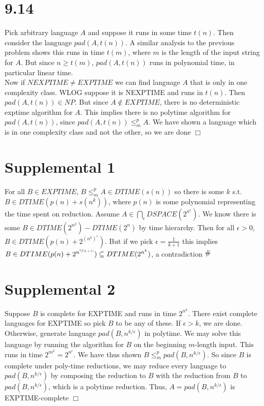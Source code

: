 \documentclass{article}
\newcommand{\contra}{\raisebox{\depth}{\#}}
\begin{document}
\section*{9.14}
Pick arbitrary language $A$ and suppose it runs in some time $t(n)$. Then consider the language $pad(A,t(n))$. A similar analysis to the previous problem shows this runs in time $t(m)$, where $m$ is the length of the input string for $A$. But since $n \geqslant t(m)$, $pad(A,t(n))$ runs in polynomial time, in particular linear time.\\
Now if $NEXPTIME \neq EXPTIME$ we can find language $A$ that is only in one complexity class. WLOG suppose it is NEXPTIME and runs in $t(n)$. Then $pad(A,t(n)) \in NP$. But since $A \notin EXPTIME$, there is no deterministic exptime algorithm for $A$. This implies there is no polytime algorithm for $pad(A,t(n))$, since $pad(A,t(n)) \leqslant_m^p A$. We have shown a language which is in one complexity class and not the other, so we are done $\Box$

\section*{Supplemental 1}
For all $B \in EXPTIME$, $B \leqslant_m^p A \in DTIME(s(n))$ so there is some $k$ s.t. $B \in DTIME(p(n) + s(n^k))$, where $p(n)$ is some polynomial representing the time spent on reduction. Assume $A \in \bigcap_\epsilon DSPACE(2^{n^\epsilon})$. We know there is some $B \in DTIME(2^{n^2}) - DTIME(2^{n})$ by time hierarchy. Then for all $\epsilon > 0$, $B \in DTIME(p(n) + 2^{(n^k)^\epsilon})$. But if we pick $\epsilon = \frac{1}{k+1}$ this implies $B \in DTIME(p(n)+2^{n^{\sfrac{k}{(k+1)}}}) \subseteq DTIME(2^{n^k})$, a contradiction $\contra$

\section*{Supplemental 2}
Suppose $B$ is complete for EXPTIME and runs in time $2^{n^k}$. There exist complete languages for EXPTIME so pick $B$ to be any of these. If $\epsilon > k$, we are done. Otherwise, generate language $pad(B,n^{k/\epsilon})$ in polytime. We may solve this language by running the algorithm for $B$ on the beginning $m$-length input. This runs in time $2^{m^k} = 2^{n^\epsilon}$. We have thus shown $B \leqslant_m^p pad(B,n^{k/\epsilon})$. So since $B$ is complete under poly-time reductions, we may reduce every language to $pad(B,n^{k/\epsilon})$ by composing the reduction to $B$ with the reduction from $B$ to $pad(B,n^{k/\epsilon})$, which is a polytime reduction. Thus, $A = pad(B,n^{k/\epsilon})$ is EXPTIME-complete $\Box$
\end{document}
